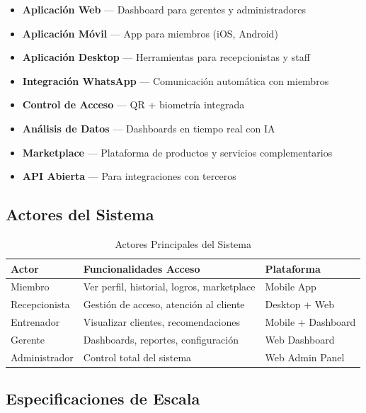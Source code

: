 \documentclass[11pt,a4paper]{article}
\begin{document}
\begin{itemize}
    \item \textbf{Aplicación Web} — Dashboard para gerentes y administradores
    \item \textbf{Aplicación Móvil} — App para miembros (iOS, Android)
    \item \textbf{Aplicación Desktop} — Herramientas para recepcionistas y staff
    \item \textbf{Integración WhatsApp} — Comunicación automática con miembros
    \item \textbf{Control de Acceso} — QR + biometría integrada
    \item \textbf{Análisis de Datos} — Dashboards en tiempo real con IA
    \item \textbf{Marketplace} — Plataforma de productos y servicios complementarios
    \item \textbf{API Abierta} — Para integraciones con terceros
\end{itemize}

\subsection{Actores del Sistema}

\begin{table}[H]
\centering
\caption{Actores Principales del Sistema}
\begin{tabular}{|l|p{6cm}|l|}
\hline
\textbf{Actor} & \textbf{Funcionalidades Acceso} & \textbf{Plataforma} \\ \hline
Miembro & Ver perfil, historial, logros, marketplace & Mobile App \\ \hline
Recepcionista & Gestión de acceso, atención al cliente & Desktop + Web \\ \hline
Entrenador & Visualizar clientes, recomendaciones & Mobile + Dashboard \\ \hline
Gerente & Dashboards, reportes, configuración & Web Dashboard \\ \hline
Administrador & Control total del sistema & Web Admin Panel \\ \hline
\end{tabular}
\end{table}

\subsection{Especificaciones de Escala}
\end{document}
